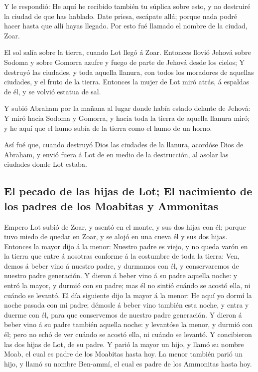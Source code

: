  Y le respondió: He aquí he recibido también tu súplica
sobre esto, y no destruiré la ciudad de que has hablado. 
Date priesa, escápate allá; porque nada podré hacer hasta que allí hayas
llegado. Por esto fué llamado el nombre de la ciudad, Zoar.

 El sol salía sobre la tierra, cuando Lot llegó á Zoar.
 Entonces llovió Jehová sobre Sodoma y sobre Gomorra
azufre y fuego de parte de Jehová desde los cielos;  Y
destruyó las ciudades, y toda aquella llanura, con todos los moradores
de aquellas ciudades, y el fruto de la tierra.  Entonces
la mujer de Lot miró atrás, á espaldas de él, y se volvió estatua de
sal.

 Y subió Abraham por la mañana al lugar donde había
estado delante de Jehová:  Y miró hacia Sodoma y Gomorra,
y hacia toda la tierra de aquella llanura miró; y he aquí que el humo
subía de la tierra como el humo de un horno.

 Así fué que, cuando destruyó Dios las ciudades de la
llanura, acordóse Dios de Abraham, y envió fuera á Lot de en medio de la
destrucción, al asolar las ciudades donde Lot estaba.

\hypertarget{el-pecado-de-las-hijas-de-lot-el-nacimiento-de-los-padres-de-los-moabitas-y-ammonitas}{%
\subsection{El pecado de las hijas de Lot; El nacimiento de los padres
de los Moabitas y
Ammonitas}\label{el-pecado-de-las-hijas-de-lot-el-nacimiento-de-los-padres-de-los-moabitas-y-ammonitas}}

 Empero Lot subió de Zoar, y asentó en el monte, y sus
dos hijas con él; porque tuvo miedo de quedar en Zoar, y se alojó en una
cueva él y sus dos hijas.  Entonces la mayor dijo á la
menor: Nuestro padre es viejo, y no queda varón en la tierra que entre á
nosotras conforme á la costumbre de toda la tierra:  Ven,
demos á beber vino á nuestro padre, y durmamos con él, y conservaremos
de nuestro padre generación.  Y dieron á beber vino á su
padre aquella noche: y entró la mayor, y durmió con su padre; mas él no
sintió cuándo se acostó ella, ni cuándo se levantó.  El
día siguiente dijo la mayor á la menor: He aquí yo dormí la noche pasada
con mi padre; démosle á beber vino también esta noche, y entra y duerme
con él, para que conservemos de nuestro padre generación.
 Y dieron á beber vino á su padre también aquella noche:
y levantóse la menor, y durmió con él; pero no echó de ver cuándo se
acostó ella, ni cuándo se levantó.  Y concibieron las dos
hijas de Lot, de su padre.  Y parió la mayor un hijo, y
llamó su nombre Moab, el cual es padre de los Moabitas hasta hoy.
 La menor también parió un hijo, y llamó su nombre
Ben-ammí, el cual es padre de los Ammonitas hasta hoy.

